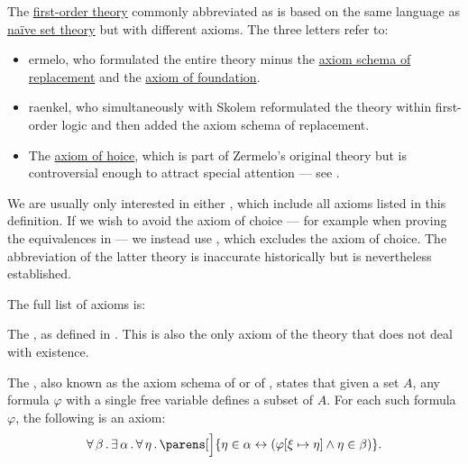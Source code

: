 \begin{definition}\label{def:zfc}
  The \hyperref[def:first_order_theory]{first-order theory} commonly abbreviated as  is based on the same language as \hyperref[def:naive_set_theory]{na\"ive set theory} but with different axioms. The three letters refer to:
  \begin{itemize}
    \item {}ermelo, who formulated the entire theory minus the \hyperref[def:zfc/replacement]{axiom schema of replacement} and the \hyperref[def:zfc/foundation]{axiom of foundation}.
    \item{} raenkel, who simultaneously with Skolem reformulated the theory within first-order logic and then added the axiom schema of replacement.
    \item The \hyperref[def:zfc/choice]{axiom of hoice}, which is part of Zermelo's original theory but is controversial enough to attract special attention --- see .
  \end{itemize}

  We are usually only interested in either , which include all axioms listed in this definition. If we wish to avoid the axiom of choice --- for example when proving the equivalences in  --- we instead use , which excludes the axiom of choice. The abbreviation of the latter theory is inaccurate historically but is nevertheless established.

  The full list of axioms is:
  \begin{thmenum}
     The , as defined in . This is also the only axiom of the theory that does not deal with existence.

     The , also known as the axiom schema of  or of , states that given a set \( A \), any formula \( \varphi \) with a single free variable defines a subset of \( A \). For each such formula \( \varphi \), the following is an axiom:
    \begin{equation}\label{eq:def:zfc/specification}
      \qforall \beta \qexists \alpha \qforall \eta \parens[\Big]{ \eta \in \alpha \leftrightarrow (\varphi[\xi \mapsto \eta] \wedge \eta \in \beta) }.
    \end{equation}


\end{thmenum}
\end{definition}
